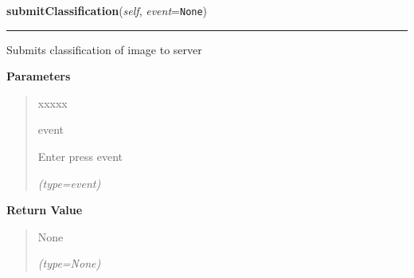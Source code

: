 \hspace{.8\funcindent}\begin{boxedminipage}{\funcwidth}

    \raggedright \textbf{submitClassification}(\textit{self}, \textit{event}={\tt None})

    \vspace{-1.5ex}

    \rule{\textwidth}{0.5\fboxrule}
\setlength{\parskip}{2ex}
    Submits classification of image to server

\setlength{\parskip}{1ex}
      \textbf{Parameters}
      \vspace{-1ex}

      \begin{quote}
        \begin{Ventry}{xxxxx}

          \item[event]

          Enter press event

            {\it (type=event)}

        \end{Ventry}

      \end{quote}

      \textbf{Return Value}
    \vspace{-1ex}

      \begin{quote}
      None

      {\it (type=None)}

      \end{quote}

    \end{boxedminipage}

    \label{client_gui:GuiClass:tabChanged}

    \vspace{0.5ex}

